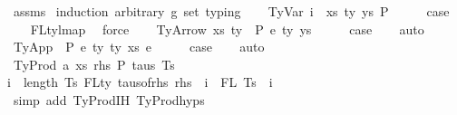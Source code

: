 \begin{isabellebody}
%
\isadelimproof
%
\endisadelimproof
%
\isatagproof
{}\isamarkupfalse%
\ assms\isanewline
{}\isamarkupfalse%
\ {\isacharparenleft}{\kern0pt}induction\ arbitrary{\isacharcolon}{\kern0pt}\ g\ set{\isacharcolon}{\kern0pt}\ typing{\isacharparenright}{\kern0pt}\isanewline
\ \ \isamarkupfalse%
\ {\isacharparenleft}{\kern0pt}TyVar\ i\ {\isasymGamma}\ xs\ ty\ ys\ P{\isacharparenright}{\kern0pt}\isanewline
\ \ \isamarkupfalse%
\ \isamarkupfalse%
\ {\isacharquery}{\kern0pt}case\isanewline
\ \ \isamarkupfalse%
\ FL{\isacharunderscore}{\kern0pt}ty{\isacharunderscore}{\kern0pt}lmap\ \isamarkupfalse%
\ force\isanewline
{}\isamarkupfalse%
\isanewline
\ \ \isamarkupfalse%
\ {\isacharparenleft}{\kern0pt}TyArrow\ xs\ ty{}\ {\isasymGamma}\ P\ e\ ty{}\ ys{\isacharparenright}{\kern0pt}\isanewline
\ \ \isamarkupfalse%
\ \isamarkupfalse%
\ {\isacharquery}{\kern0pt}case\isanewline
\ \ \isamarkupfalse%
\ auto\isanewline
\ \ \isamarkupfalse%
\isanewline
{}\isamarkupfalse%
\isanewline
\ \ \isamarkupfalse%
\ {\isacharparenleft}{\kern0pt}TyApp\ {\isasymGamma}\ P\ e{}\ ty{}\ ty{}\ xs\ e{}{\isacharparenright}{\kern0pt}\isanewline
\ \ \isamarkupfalse%
\ \isamarkupfalse%
\ {\isacharquery}{\kern0pt}case\isanewline
\ \ \isamarkupfalse%
\ auto\isanewline
\ \ \isamarkupfalse%
\isanewline
{}\isamarkupfalse%
\isanewline
\ \ \isamarkupfalse%
\ {\isacharparenleft}{\kern0pt}TyProd\ a\ xs\ rhs\ P\ taus\ Ts\ {\isasymGamma}{\isacharparenright}{\kern0pt}\isanewline
\ \ \isamarkupfalse%
{\isachardoublequoteopen}{\isasymforall}i\ {\isacharless}{\kern0pt}\ length\ Ts{\isachardot}{\kern0pt}\ FLty\ {\isacharparenleft}{\kern0pt}taus{\isacharunderscore}{\kern0pt}of{\isacharunderscore}{\kern0pt}rhs\ rhs\ {\isacharbang}{\kern0pt}\ i{\isacharparenright}{\kern0pt}\ {\isacharequal}{\kern0pt}\ FL\ {\isacharparenleft}{\kern0pt}Ts\ {\isacharbang}{\kern0pt}\ i{\isacharparenright}{\kern0pt}{\isachardoublequoteclose}\isanewline
\ \ \ \ \ \isamarkupfalse%
\ {\isacharparenleft}{\kern0pt}simp\ add{\isacharcolon}{\kern0pt}\ TyProd{\isachardot}{\kern0pt}IH\ TyProd{\isachardot}{\kern0pt}hyps{\isacharparenleft}{\kern0pt}{}{\isacharparenright}{\kern0pt}{\isacharparenright}{\kern0pt}\isanewline

\end{isabellebody}
